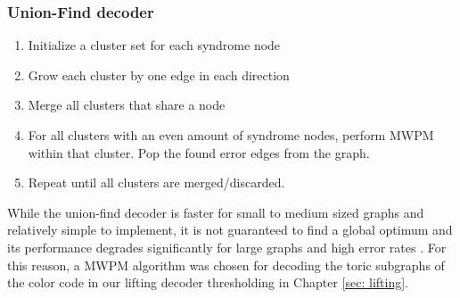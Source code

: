 \subsubsection{Union-Find decoder}
\begin{enumerate}
    \item Initialize a cluster set for each syndrome node
    \item Grow each cluster by one edge in each direction
    \item Merge all clusters that share a node
    \item For all clusters with an even amount of syndrome nodes,
    perform MWPM within that cluster. Pop the found error edges from
    the graph.
    \item Repeat until all clusters are merged/discarded.
\end{enumerate}
While the union-find decoder is faster for small to medium
sized graphs and relatively simple to implement,
 it is not guaranteed to find a global optimum
and its performance degrades significantly for large
graphs and high error rates \cite{UFDecoder}.
For this reason, a MWPM algorithm was chosen for decoding the toric
subgraphs of the color code in our lifting decoder thresholding
in Chapter \ref{sec: lifting}.